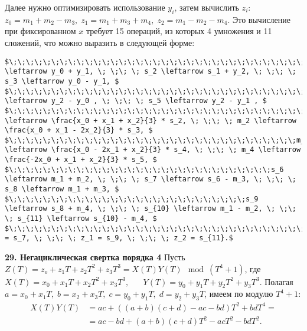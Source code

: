\documentclass{../../template/mai_book}
\begin{document}
Далее нужно оптимизировать использование $y_i$, затем вычислить \newline $z_i$: $z_0 = m_1 + m_2 - m_3, \; z_1 = m_1 + m_3 + m_4, \; z_2 = m_1 - m_2 - m_4$. Это вычисление при фиксированном $x$ требует 15 операций, из которых 4 умножения и 11 сложений, что можно выразить в следующей форме:
\begin{lstlisting}[mathescape=true]
$\;\;\;\;\;\;\;\;\;\;\;\;\;\;\;\;\;\;\;\;\;\;\;\;\;\;\;\;\;\;\;\;\;\;\;s_1 \leftarrow y_0 + y_1, \; \;\; \; s_2 \leftarrow s_1 + y_2, \; \;\; \; s_3 \leftarrow y_0 - y_1, $  
$\;\;\;\;\;\;\;\;\;\;\;\;\;\;\;\;\;\;\;\;\;\;\;\;\;\;\;\;\;\;\;\;\;\;\;\;\;\;\;\;\;\;\;\;\;\;\;\;s_4 \leftarrow y_2 - y_0 , \; \;\; \; s_5 \leftarrow y_2 - y_1 , $ 
$\;\;\;\;\;\;\;\;\;\;\;\;\;\;\;\;\;\;\;\;\;\;\;\;\;\;\;\;\;\;\;\;\;\;\;\;\;m_1 \leftarrow \frac{x_0 + x_1 + x_2}{3} * s_2, \; \;\; \; m_2 \leftarrow \frac{x_0 + x_1 - 2x_2}{3} * s_3, $ 
$\;\;\;\;\;\;\;\;\;\;\;\;\;\;\;\;\;\;\;\;\;\;\;\;\;\;\;\;\;\;\;\;\;\;m_3 \leftarrow \frac{x_0 - 2x_1 + x_2}{3} * s_4, \; \;\; \; m_4 \leftarrow \frac{-2x_0 + x_1 + x_2}{3} * s_5, $ 
$\;\;\;\;\;\;\;\;\;\;\;\;\;\;\;\;\;\;\;\;\;\;\;\;\;\;\;\;\;\;\;s_6 \leftarrow m_1 + m_2, \; \;\; \; s_7 \leftarrow s_6 - m_3, \; \;\; \; s_8 \leftarrow m_1 + m_3, $ 
$\;\;\;\;\;\;\;\;\;\;\;\;\;\;\;\;\;\;\;\;\;\;\;\;\;\;\;\;s_9 \leftarrow s_8 + m_4, \; \;\; \; s_{10} \leftarrow m_1 - m_2, \; \;\; \; s_{11} \leftarrow s_{10} - m_4, $ 
$\;\;\;\;\;\;\;\;\;\;\;\;\;\;\;\;\;\;\;\;\;\;\;\;\;\;\;\;\;\;\;\;\;\;\;\;\;\;\;\;\;\;\;\;\;\;\;z_0 = s_7, \; \;\; \; z_1 = s_9, \; \;\; \; z_2 = s_{11}.$
\end{lstlisting}
\newpage
\noindent
\textbf{29. Негациклическая свертка порядка 4} \newline \newline
\indent Пусть $Z(T) = z_o + z_1 T + z_2 T^2 + z_3 T^3 = X(T)Y(T) \mod (T^4 + 1)$, где \newline \newline \indent $X(T) = x_0 + x_1 T + x_2 T^2 + x_3 T^3, \; \; \; \; \; \; Y(T) = y_0 + y_1 T + y_2 T^2 + y_3 T^3$. \newline
\newline
Полагая $a = x_0 + x_1 T, \; b = x_2 + x_3 T, \; c = y_0 + y_1 T, \; d = y_2 + y_3 T$, имеем по модулю $T^4 + 1:$ 
\begin{align*}
X(T)Y(T) &= ac + ((a + b)(c + d) - ac - bd)T^2 + bdT^4 = \\
&= ac - bd + (a + b)(c + d)T^2 - acT^2 - bdT^2.
\end{align*}
\end{document}
